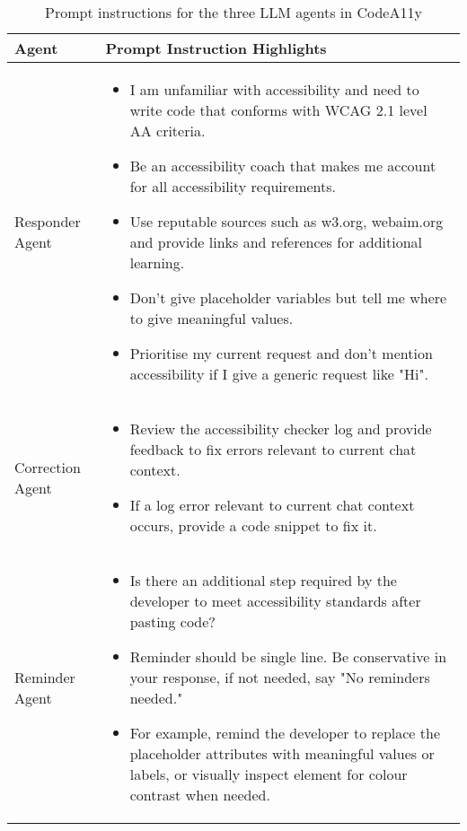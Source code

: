 \begin{table*}
  \caption{Prompt instructions for the three LLM agents in CodeA11y}
  \label{tab:sys_prompt}
  \small
  \begin{tabular}{m{}|m{}}
    \toprule
    \textbf{Agent} & \textbf{Prompt Instruction Highlights}\\
    \midrule
    Responder Agent & {\begin{itemize}[leftmargin=*, partopsep=7pt]
        \item I am unfamiliar with accessibility and need to write code that conforms with WCAG 2.1 level AA criteria.
        \item Be an accessibility coach that makes me account for all accessibility requirements.
        \item Use reputable sources such as w3.org, webaim.org and provide links and references for additional learning. 
        \item Don't give placeholder variables but tell me where to give meaningful values.
        \item Prioritise my current request and don't mention accessibility if I give a generic request like "Hi".
    \end{itemize}} \\ \midrule
    Correction Agent & {\begin{itemize}[leftmargin=*, partopsep=7pt]
        \item Review the accessibility checker log and provide feedback to fix errors relevant to current chat context.
        \item If a log error relevant to current chat context occurs, provide a code snippet to fix it.
    \end{itemize}} \\ \midrule
    Reminder Agent & {\begin{itemize}[leftmargin=*, partopsep=7pt]
        \item Is there an additional step required by the developer to meet accessibility standards after pasting code?
        \item Reminder should be single line. Be conservative in your response, if not needed, say "No reminders needed."
        \item For example, remind the developer to replace the placeholder attributes with meaningful values or labels, or visually inspect element for colour contrast when needed.
    \end{itemize}}\\ 
    \bottomrule
  \end{tabular}
\end{table*}
